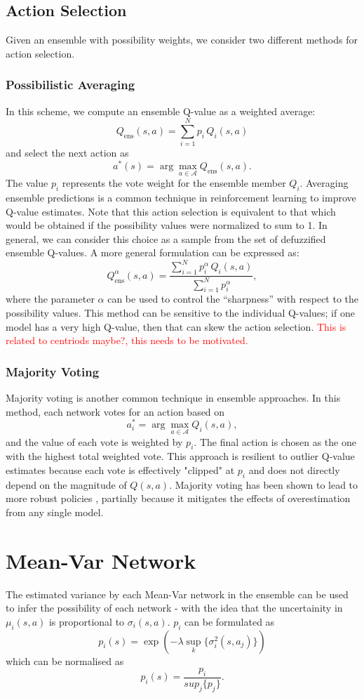 \documentclass[12pt,a4paper]{report}
\newcommand\myworries[1]{\textcolor{red}{#1}}
\begin{document}
\subsection{Action Selection}
Given an ensemble with possibility weights, we consider two different methods for action selection.

\subsubsection{Possibilistic Averaging}
In this scheme, we compute an ensemble Q-value as a weighted average:
\[
  Q_{\text{ens}}(s,a) = \sum_{i=1}^N p_i\, Q_i(s,a)
\]
and select the next action as
\[
  a^*(s) = \arg \max_{a \in \mathcal{A}} Q_{\text{ens}}(s,a).
\]
The value \(p_i\) represents the vote weight for the ensemble member \(Q_i\). Averaging ensemble predictions is a common technique in reinforcement learning to improve Q-value estimates. Note that this action selection is equivalent to that which would be obtained if the possibility values were normalized to sum to 1. In general, we can consider this choice as a sample from the set of defuzzified ensemble Q-values. A more general formulation can be expressed as:
\[
  Q_{\text{ens}}^\alpha(s,a) = \frac{\sum_{i=1}^N p_i^\alpha \, Q_i(s,a)}{\sum_{i=1}^N p_i^\alpha},
\]
where the parameter \(\alpha\) can be used to control the “sharpness” with respect to the possibility values. This method can be sensitive to the individual Q-values; if one model has a very high Q-value, then that can skew the action selection. \myworries{This is related to centriods maybe?, this needs to be motivated. }

\subsubsection{Majority Voting}
Majority voting is another common technique in ensemble approaches. In this method, each network votes for an action based on
\[
  a_i^* = \arg \max_{a \in \mathcal{A}} Q_i(s,a),
\]
and the value of each vote is weighted by \(p_i\). The final action is chosen as the one with the highest total weighted vote. This approach is resilient to outlier Q-value estimates because each vote is effectively "clipped" at \(p_i\) and does not directly depend on the magnitude of \(Q(s,a)\). Majority voting has been shown to lead to more robust policies \cite{Hans2010}, partially because it mitigates the effects of overestimation from any single model.

\section{Mean-Var Network}
The estimated variance by each Mean-Var network in the ensemble can be used to infer the possibility of each network - with the idea that the uncertainity in $\mu_i(s,a)$ is proportional to $\sigma_i(s,a)$. $p_i$ can be formulated as 
\[
  p_i(s) = \exp(-\lambda \sup_k\{\sigma_i^2(s,a_j)\})
\]
which can be normalised as 
\[
  p_i(s) = \frac{p_i}{sup_j\{p_j\}}.
\]
\end{document}
